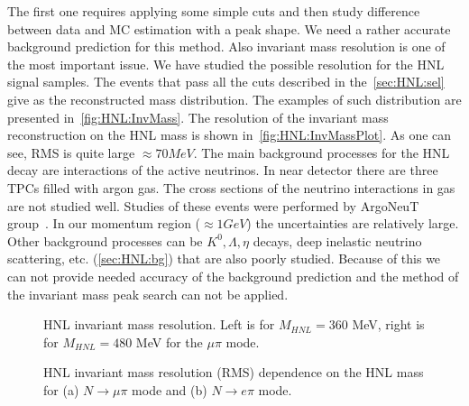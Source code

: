 \documentclass[../main.tex]{subfiles}
\begin{document}
The first one requires applying some simple cuts and then study difference between data and MC estimation with a peak shape. We need a rather accurate background prediction for this method. Also invariant mass resolution is one of the most important issue. We have studied the possible resolution for the HNL signal samples. The events that pass all the cuts described in the~\autoref{sec:HNL:sel} give as the reconstructed mass distribution. The examples of such distribution are presented in~\autoref{fig:HNL:InvMass}. The resolution of the invariant mass reconstruction on the HNL mass is shown in~\autoref{fig:HNL:InvMassPlot}. As one can see, RMS is quite large $\approx70MeV$. The main background processes for the HNL decay are  interactions of the active neutrinos. In near detector there are three TPCs filled with argon gas. The cross sections of the neutrino interactions in gas are not studied well. Studies of these events were performed by ArgoNeuT group~\cite{Acciarri2014}. In our momentum region ($\approx1GeV$) the uncertainties are relatively large. Other background processes can be $K^0, \Lambda, \eta$ decays, deep inelastic neutrino scattering, etc. (\autoref{sec:HNL:bg}) that are also poorly studied. Because of this we can not provide needed accuracy of the background prediction and the method of the invariant mass peak search can not be applied.
\begin{figure}[!ht]
    \begin{minipage}[!ht]{0.49\linewidth}
    \end{minipage}
    \hfill
    \begin{minipage}[!ht]{0.49\linewidth}
    \end{minipage}
    \caption{HNL invariant mass resolution. Left is for $M_{HNL}=360$ MeV, right is for $M_{HNL}=480$ MeV for the $\mu\pi$ mode.}
    \label{fig:HNL:InvMass}
\end{figure}

\begin{figure}[!ht]
    \begin{minipage}[!ht]{0.49\linewidth}
    \end{minipage}
    \hfill
    \begin{minipage}[!ht]{0.49\linewidth}
    \end{minipage}
    \caption{HNL invariant mass resolution (RMS) dependence on the HNL mass for (a) $N\to \mu\pi$ mode and (b) $N\to e\pi$ mode.}
    \label{fig:HNL:InvMassPlot}
\end{figure}
\end{document}
